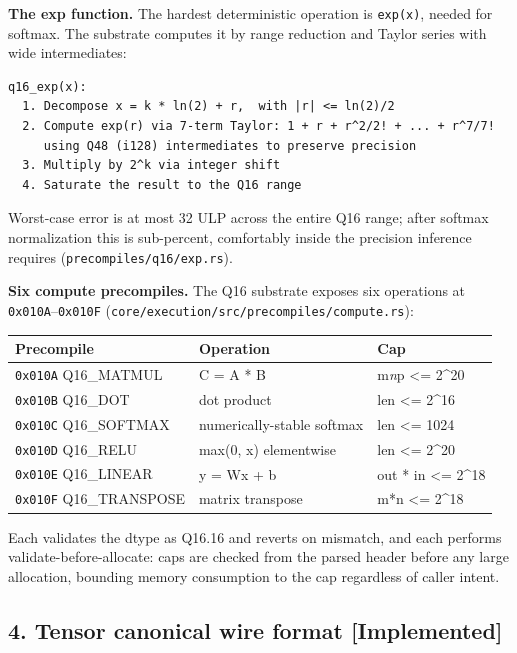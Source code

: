 \textbf{The exp function.} The hardest deterministic operation is
\texttt{exp(x)}, needed for softmax. The substrate computes it by range
reduction and Taylor series with wide intermediates:

\begin{verbatim}
q16_exp(x):
  1. Decompose x = k * ln(2) + r,  with |r| <= ln(2)/2
  2. Compute exp(r) via 7-term Taylor: 1 + r + r^2/2! + ... + r^7/7!
     using Q48 (i128) intermediates to preserve precision
  3. Multiply by 2^k via integer shift
  4. Saturate the result to the Q16 range
\end{verbatim}

Worst-case error is at most 32 ULP across the entire Q16 range; after
softmax normalization this is sub-percent, comfortably inside the
precision inference requires (\texttt{precompiles/q16/exp.rs}).

\textbf{Six compute precompiles.} The Q16 substrate exposes six
operations at \texttt{0x010A}--\texttt{0x010F}
(\texttt{core/execution/src/precompiles/compute.rs}):

{\def\LTcaptype{none} %
\begin{longtable}[]{@{}lll@{}}
\toprule\noalign{}
Precompile & Operation & Cap \\
\midrule\noalign{}
\endhead
\bottomrule\noalign{}
\endlastfoot
\texttt{0x010A} Q16\_MATMUL & C = A * B & m\emph{n}p \textless=
2\^{}20 \\
\texttt{0x010B} Q16\_DOT & dot product & len \textless= 2\^{}16 \\
\texttt{0x010C} Q16\_SOFTMAX & numerically-stable softmax & len
\textless= 1024 \\
\texttt{0x010D} Q16\_RELU & max(0, x) elementwise & len \textless=
2\^{}20 \\
\texttt{0x010E} Q16\_LINEAR & y = Wx + b & out * in \textless=
2\^{}18 \\
\texttt{0x010F} Q16\_TRANSPOSE & matrix transpose & m*n \textless=
2\^{}18 \\
\end{longtable}
}

Each validates the dtype as Q16.16 and reverts on mismatch, and each
performs validate-before-allocate: caps are checked from the parsed
header before any large allocation, bounding memory consumption to the
cap regardless of caller intent.

\subsection{4. Tensor canonical wire format
{[}Implemented{]}}\label{tensor-canonical-wire-format-implemented}

